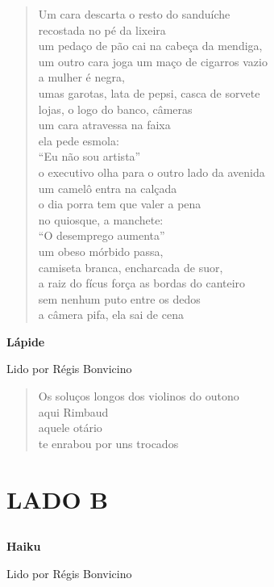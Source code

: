 \begin{verse}
Um cara descarta o resto do sanduíche\\
recostada no pé da lixeira\\
um pedaço de pão cai na cabeça da mendiga,\\
um outro cara joga um maço de cigarros vazio\\
a mulher é negra,\\
umas garotas, lata de pepsi, casca de sorvete\\
lojas, o logo do banco, câmeras\\
um cara atravessa na faixa\\
ela pede esmola:\\
``Eu não sou artista''\\
o executivo olha para o outro lado da avenida\\
um camelô entra na calçada\\
o dia porra tem que valer a pena\\
no quiosque, a manchete:\\
``O desemprego aumenta''\\
um obeso mórbido passa,\\
camiseta branca, encharcada de suor,\\
a raiz do fícus força as bordas do canteiro\\
sem nenhum puto entre os dedos\\
a câmera pifa, ela sai de cena
\end{verse}

\pagebreak

\textbf{Lápide}

Lido por Régis Bonvicino

\begin{verse}
Os soluços longos dos violinos do outono\\
aqui Rimbaud\\
aquele otário\\
te enrabou por uns trocados
\end{verse}


\part{LADO B}

\chapter*{}
\textbf{Haiku}\\
Lido por Régis Bonvicino

